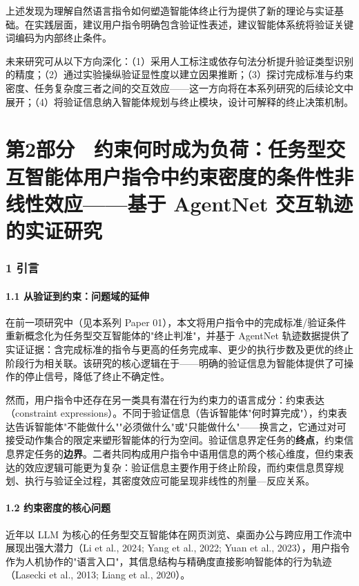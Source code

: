 \documentclass[12pt,a4paper,openany,oneside]{ctexrep}
\begin{document}
上述发现为理解自然语言指令如何塑造智能体终止行为提供了新的理论与实证基础。在实践层面，建议用户指令明确包含验证性表述，建议智能体系统将验证关键词编码为内部终止条件。

未来研究可从以下方向深化：（1）采用人工标注或依存句法分析提升验证类型识别的精度；（2）通过实验操纵验证显性度以建立因果推断；（3）探讨完成标准与约束密度、任务复杂度三者之间的交互效应——这一方向将在本系列研究的后续论文中展开；（4）将验证信息纳入智能体规划与终止模块，设计可解释的终止决策机制。


\newpage

\chapter{第2部分　约束何时成为负荷：任务型交互智能体用户指令中约束密度的条件性非线性效应——基于 AgentNet 交互轨迹的实证研究}


\subsection{1 引言}


\subsubsection{1.1 从验证到约束：问题域的延伸}


在前一项研究中（见本系列 Paper 01），本文将用户指令中的完成标准/验证条件重新概念化为任务型交互智能体的"终止判准"，并基于 AgentNet 轨迹数据提供了实证证据：含完成标准的指令与更高的任务完成率、更少的执行步数及更优的终止阶段行为相关联。该研究的核心逻辑在于——明确的验证信息为智能体提供了可操作的停止信号，降低了终止不确定性。

然而，用户指令中还存在另一类具有潜在行为约束力的语言成分：约束表达（constraint expressions）。不同于验证信息（告诉智能体"何时算完成"），约束表达告诉智能体"不能做什么""必须做什么"或"只能做什么"——换言之，它通过对可接受动作集合的限定来塑形智能体的行为空间。验证信息界定任务的\textbf{终点}，约束信息界定任务的\textbf{边界}。二者共同构成用户指令中语用信息的两个核心维度，但约束表达的效应逻辑可能更为复杂：验证信息主要作用于终止阶段，而约束信息贯穿规划、执行与验证全过程，其密度效应可能呈现非线性的剂量—反应关系。

\subsubsection{1.2 约束密度的核心问题}


近年以 LLM 为核心的任务型交互智能体在网页浏览、桌面办公与跨应用工作流中展现出强大潜力（Li et al., 2024; Yang et al., 2022; Yuan et al., 2023），用户指令作为人机协作的"语言入口"，其信息结构与精确度直接影响智能体的行为轨迹（Lasecki et al., 2013; Liang et al., 2020）。
\end{document}
